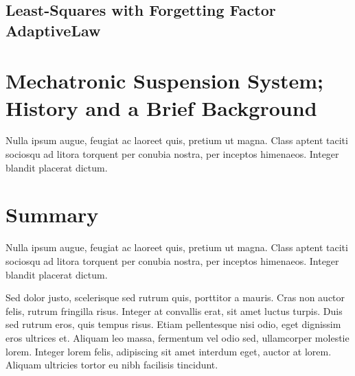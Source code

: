 \subsection{Least-Squares with Forgetting Factor AdaptiveLaw}

\section{Mechatronic Suspension System; History and a Brief Background}
Nulla ipsum augue, feugiat ac laoreet quis, pretium ut magna. Class aptent taciti sociosqu ad litora torquent per conubia nostra, per inceptos himenaeos. Integer blandit placerat dictum.



\section{Summary}
Nulla ipsum augue, feugiat ac laoreet quis, pretium ut magna. Class aptent taciti sociosqu ad litora torquent per conubia nostra, per inceptos himenaeos. Integer blandit placerat dictum.

Sed dolor justo, scelerisque sed rutrum quis, porttitor a mauris. Cras non auctor felis, rutrum fringilla risus. Integer at convallis erat, sit amet luctus turpis. Duis sed rutrum eros, quis tempus risus. Etiam pellentesque nisi odio, eget dignissim eros ultrices et. Aliquam leo massa, fermentum vel odio sed, ullamcorper molestie lorem. Integer lorem felis, adipiscing sit amet interdum eget, auctor at lorem. Aliquam ultricies tortor eu nibh facilisis tincidunt.